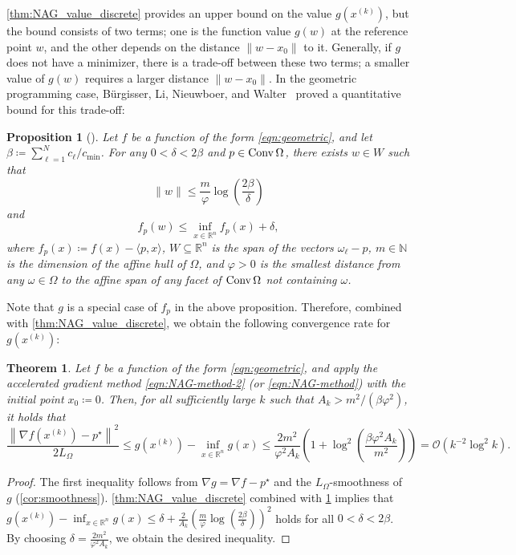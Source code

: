 \documentclass[11pt,a4paper]{article}
\theoremstyle{definition}
\theoremstyle{plain}
\newtheorem{thm}{Theorem}[section]
\newtheorem{prop}[prop]{Proposition}
\newcommand{\RR}{{\mathbb{R}}}
\newcommand{\NN}{{\mathbb{N}}}
\newcommand{\conv}{\mathop{\rm Conv}}
\begin{document}
\cref{thm:NAG_value_discrete} provides an upper bound on the value $g(x^{(k)})$, but the bound consists of two terms; one is the function value $g(w)$ at the reference point $w$, and the other depends on the distance $\|w - x_0\|$ to it.
Generally, if $g$ does not have a minimizer, there is a trade-off between these two terms; a smaller value of $g(w)$ requires a larger distance $\|w - x_0\|$.
In the geometric programming case, B\"{u}rgisser, Li, Nieuwboer, and Walter~\cite{BLNW2020} proved a quantitative bound for this trade-off:
\begin{prop}[{\cite[Theorem~2.4]{BLNW2020}}]\label{prop:geometric-diameter}
    Let $f$ be a function of the form \eqref{eqn:geometric}, and let $\beta \coloneqq \sum_{\ell = 1}^Nc_\ell/c_{\mathrm{\min}}$.
    For any $0 < \delta < 2\beta$ and $p \in \conv\Omega$, there exists $w \in W$ such that
    \[
        \|w\| \le \frac{m}\varphi\log\left(\frac{2\beta}\delta\right)
    \]
    and
    \[
        f_p(w) \le \inf_{x \in \RR^n}f_p(x) + \delta,
    \]
    where $f_p(x) \coloneqq f(x) - \langle p, x\rangle$, $W \subseteq \RR^n$ is the span of the vectors $\omega_\ell - p$, $m \in \NN$ is the dimension of the affine hull of $\Omega$, and $\varphi > 0$ is the smallest distance from any $\omega \in \Omega$ to the affine span of any facet of $\conv\Omega$ not containing $\omega$.
\end{prop}
Note that $g$ is a special case of $f_p$ in the above proposition.
Therefore, combined with \cref{thm:NAG_value_discrete}, we obtain the following convergence rate for $g(x^{(k)})$:
\begin{thm}\label{thm:geometric-g}
    Let $f$ be a function of the form \eqref{eqn:geometric}, and apply the accelerated gradient method \eqref{eqn:NAG-method-2} (or \eqref{eqn:NAG-method}) with the initial point $x_0 \coloneqq 0$.
    Then, for all sufficiently large $k$ such that $A_k > m^2/(\beta\varphi^2)$, it holds that
    \[
        \frac{\left\|\nabla f\left(x^{(k)}\right) - p^\star\right\|^2}{2L_\Omega} \le g\left(x^{(k)}\right) - \inf_{x \in \RR^n}g(x) \le \frac{2m^2}{\varphi^2A_k}\left(1 + \log^2\left(\frac{\beta\varphi^2A_k}{m^2}\right)\right) = \mathcal{O}(k^{-2}\log^2k).
    \]
\end{thm}
\begin{proof}
    The first inequality follows from $\nabla g = \nabla f - p^\star$ and the $L_\Omega$-smoothness of $g$ (\cref{cor:smoothness}).
    \cref{thm:NAG_value_discrete} combined with \cref{prop:geometric-diameter} implies that $g\left(x^{(k)}\right) - \inf_{x \in \RR^n}g(x) \le \delta + \frac2{A_k}\left(\frac{m}{\varphi}\log\left(\frac{2\beta}\delta\right)\right)^2$ holds for all $0 < \delta < 2\beta$.
    By choosing $\delta = \frac{2m^2}{\varphi^2A_k}$, we obtain the desired inequality.
\end{proof}
\end{document}
